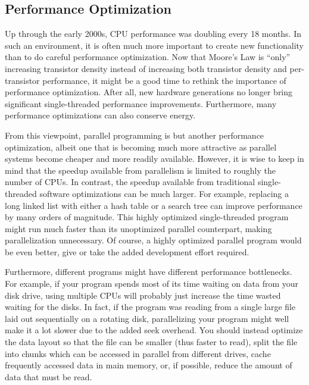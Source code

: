 \subsection{Performance Optimization}
\label{sec:intro:Performance Optimization}

Up through the early 2000s, CPU performance was doubling every 18 months.
In such an environment, it is often much more important to create new
functionality than to do careful performance optimization.
Now that Moore's Law is ``only'' increasing transistor density instead
of increasing both transistor density and per-transistor performance,
it might be a good time to rethink the importance of performance
optimization.
After all, new hardware generations no longer bring significant
single-threaded performance improvements.
Furthermore, many performance optimizations can also conserve energy.

From this viewpoint, parallel programming is but another performance
optimization, albeit one that is becoming much more attractive
as parallel systems become cheaper and more readily available.
However, it is wise to keep in mind that the speedup available from
parallelism is limited to roughly the number of CPUs.
In contrast, the speedup available from traditional single-threaded
software optimizations can be much larger.
For example, replacing a long linked list with either a hash table
or a search tree can improve performance by many orders of magnitude.
This highly optimized single-threaded program might run much
faster than its unoptimized parallel counterpart, making parallelization
unnecessary.
Of course, a highly optimized parallel program would be even better,
give or take the added development effort required.

Furthermore, different programs might have different performance
bottlenecks.
For example, if your program spends most of its time
waiting on data from your disk drive,
using multiple CPUs will probably just increase the time wasted waiting
for the disks.
In fact, if the program was reading from a single large file laid out
sequentially on a rotating disk, parallelizing your program might
well make it a lot slower due to the added seek overhead.
You should instead optimize the data layout so that
the file can be smaller (thus faster to read), split the file into chunks
which can be accessed in parallel from different drives, 
cache frequently accessed data in main memory,
or, if possible,
reduce the amount of data that must be read.

